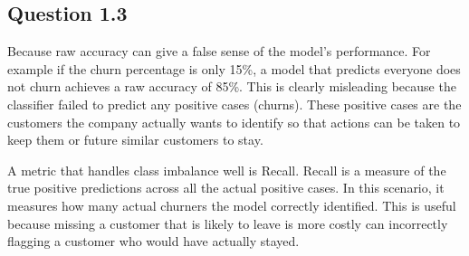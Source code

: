 \subsection{Question 1.3}

Because raw accuracy can give a false sense of the model's performance. For example if the
churn percentage is only 15\%, a model that predicts everyone does not churn achieves a
raw accuracy of 85\%. This is clearly misleading because the classifier failed to predict 
any positive cases (churns). These positive cases are the customers the company actually wants to identify so that
actions can be taken to keep them or future similar customers to stay.

A metric that handles class imbalance well is Recall. Recall is a measure
of the true positive predictions across all the actual positive cases. In this scenario,
it measures how many actual churners the model correctly identified. This is useful because 
missing a customer that is likely to leave is more costly can incorrectly flagging a customer
who would have actually stayed.
